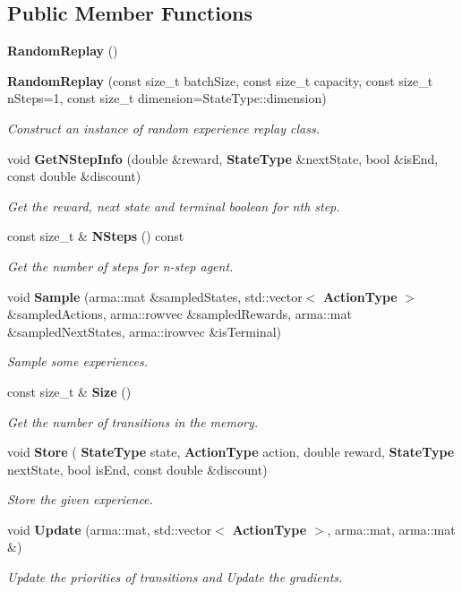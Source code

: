 \subsection*{Public Member Functions}
\begin{DoxyCompactItemize}
\item 
\textbf{ Random\+Replay} ()
\item 
\textbf{ Random\+Replay} (const size\+\_\+t batch\+Size, const size\+\_\+t capacity, const size\+\_\+t n\+Steps=1, const size\+\_\+t dimension=State\+Type\+::dimension)
\begin{DoxyCompactList}\small\item\em Construct an instance of random experience replay class. \end{DoxyCompactList}\item 
void \textbf{ Get\+N\+Step\+Info} (double \&reward, \textbf{ State\+Type} \&next\+State, bool \&is\+End, const double \&discount)
\begin{DoxyCompactList}\small\item\em Get the reward, next state and terminal boolean for nth step. \end{DoxyCompactList}\item 
const size\+\_\+t \& \textbf{ N\+Steps} () const
\begin{DoxyCompactList}\small\item\em Get the number of steps for n-\/step agent. \end{DoxyCompactList}\item 
void \textbf{ Sample} (arma\+::mat \&sampled\+States, std\+::vector$<$ \textbf{ Action\+Type} $>$ \&sampled\+Actions, arma\+::rowvec \&sampled\+Rewards, arma\+::mat \&sampled\+Next\+States, arma\+::irowvec \&is\+Terminal)
\begin{DoxyCompactList}\small\item\em Sample some experiences. \end{DoxyCompactList}\item 
const size\+\_\+t \& \textbf{ Size} ()
\begin{DoxyCompactList}\small\item\em Get the number of transitions in the memory. \end{DoxyCompactList}\item 
void \textbf{ Store} (\textbf{ State\+Type} state, \textbf{ Action\+Type} action, double reward, \textbf{ State\+Type} next\+State, bool is\+End, const double \&discount)
\begin{DoxyCompactList}\small\item\em Store the given experience. \end{DoxyCompactList}\item 
void \textbf{ Update} (arma\+::mat, std\+::vector$<$ \textbf{ Action\+Type} $>$, arma\+::mat, arma\+::mat \&)
\begin{DoxyCompactList}\small\item\em Update the priorities of transitions and Update the gradients. \end{DoxyCompactList}\end{DoxyCompactItemize}


